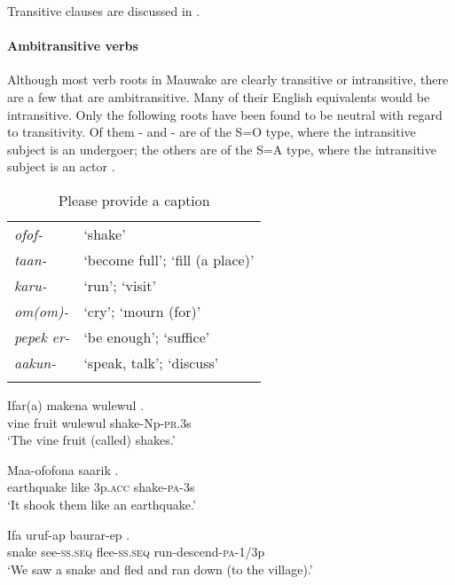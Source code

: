 Transitive clauses are discussed in .

\paragraph{Ambitransitive verbs}\label{sec:3.8.4.2.3}
{}
Although most verb roots in Mauwake are clearly transitive or intransitive, there are a few that are ambitransitive. Many of their English equivalents would be intransitive. Only the following roots have been found to be neutral with regard to transitivity. Of them - and - are of the S=O type, where the intransitive subject is an undergoer; the others are of the S=A type, where the intransitive subject is an actor \citep[124]{Dixon2010b}.

\begin{table}
\caption{Please provide a caption}
 
\begin{tabular}{>{\itshape}ll}
\mytoprule
ofof- &`shake'\\
taan- &`become full'; `fill (a place)'\\
karu- &`run'; `visit'\\
om(om)- &`cry'; `mourn (for)'\\
pepek er- &`be enough'; `suffice'\\
aakun- &`speak, talk'; `discuss'\\
\mybottomrule
\end{tabular}

\end{table}

\ea%
\label{ex:3:x1827}
\gll Ifar(a) makena wulewul . \\
vine fruit wulewul shake-Np-\textsc{pr}.3s\\
\glt`The vine fruit (called)  shakes.'
\z

\ea%
\label{ex:3:x1826}
\gll Maa-ofofona saarik  . \\
earthquake like 3p.\textsc{acc} shake-\textsc{pa}-3s\\
\glt`It shook them like an earthquake.'
\z

\ea%
\label{ex:3:x304}
\gll Ifa uruf-ap baurar-ep . \\
snake see-\textsc{ss}.\textsc{seq} flee-\textsc{ss}.\textsc{seq} run-descend-\textsc{pa}-1/3p \\
\glt`We saw a snake and fled and ran down (to the village).'
\z

